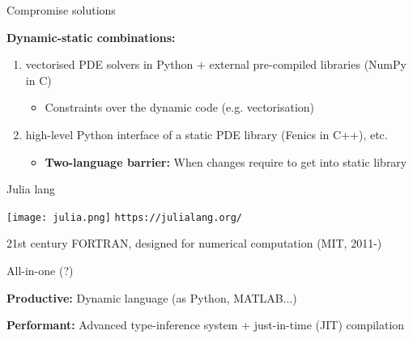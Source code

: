 \begin{frame}{Compromise solutions}

\textbf{Dynamic-static combinations:}

\begin{enumerate}
\item vectorised PDE solvers in Python + external pre-compiled libraries (NumPy in C)
\begin{itemize}
  \item Constraints over the dynamic code (e.g. vectorisation)
\end{itemize}
\item high-level Python interface of a static PDE library (Fenics in C++), etc.
\begin{itemize}
  \item \textbf{Two-language barrier:} When changes require to get into static library
\end{itemize}
\end{enumerate}


\end{frame}

\begin{frame}{Julia lang}


      \texttt{[image: julia.png]}
      \texttt{https://julialang.org/}

      21st century FORTRAN, designed for numerical computation (MIT, 2011-)

\begin{block}{All-in-one (?)}

\textbf{Productive:} Dynamic language (as Python, MATLAB...)

\textbf{Performant:} Advanced type-inference system + just-in-time (JIT) compilation

\end{block}




\end{frame}

